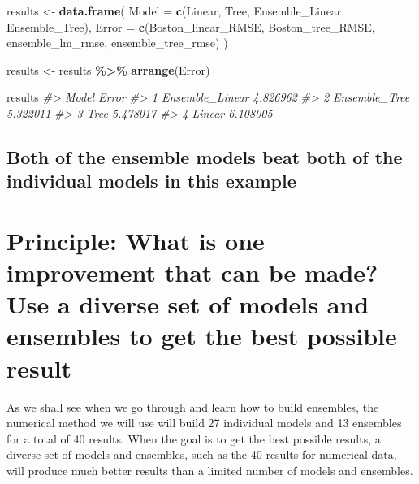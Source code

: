 \documentclass[
]{book}
\newenvironment{Shaded}{\begin{snugshade}}{\end{snugshade}}
\newcommand{\CommentTok}[1]{\textcolor[rgb]{0.56,0.35,0.01}{\textit{#1}}}
\newcommand{\FunctionTok}[1]{\textcolor[rgb]{0.13,0.29,0.53}{\textbf{#1}}}
\newcommand{\NormalTok}[1]{#1}
\newcommand{\OtherTok}[1]{\textcolor[rgb]{0.56,0.35,0.01}{#1}}
\newcommand{\SpecialCharTok}[1]{\textcolor[rgb]{0.81,0.36,0.00}{\textbf{#1}}}
\newcommand{\StringTok}[1]{\textcolor[rgb]{0.31,0.60,0.02}{#1}}
\begin{document}
\begin{Shaded}
\begin{Highlighting}[]
\NormalTok{results }\OtherTok{\textless{}{-}} \FunctionTok{data.frame}\NormalTok{(}
  \StringTok{\textquotesingle{}Model\textquotesingle{}} \OtherTok{=} \FunctionTok{c}\NormalTok{(}\StringTok{\textquotesingle{}Linear\textquotesingle{}}\NormalTok{, }\StringTok{\textquotesingle{}Tree\textquotesingle{}}\NormalTok{, }\StringTok{\textquotesingle{}Ensemble\_Linear\textquotesingle{}}\NormalTok{, }\StringTok{\textquotesingle{}Ensemble\_Tree\textquotesingle{}}\NormalTok{),}
  \StringTok{\textquotesingle{}Error\textquotesingle{}} \OtherTok{=} \FunctionTok{c}\NormalTok{(Boston\_linear\_RMSE, Boston\_tree\_RMSE, ensemble\_lm\_rmse, ensemble\_tree\_rmse)}
\NormalTok{)}

\NormalTok{results }\OtherTok{\textless{}{-}}\NormalTok{ results }\SpecialCharTok{\%\textgreater{}\%} \FunctionTok{arrange}\NormalTok{(Error)}

\NormalTok{results}
\CommentTok{\#\textgreater{}             Model    Error}
\CommentTok{\#\textgreater{} 1 Ensemble\_Linear 4.826962}
\CommentTok{\#\textgreater{} 2   Ensemble\_Tree 5.322011}
\CommentTok{\#\textgreater{} 3            Tree 5.478017}
\CommentTok{\#\textgreater{} 4          Linear 6.108005}
\end{Highlighting}
\end{Shaded}

\subsection{Both of the ensemble models beat both of the individual models in this example}\label{both-of-the-ensemble-models-beat-both-of-the-individual-models-in-this-example}

\section{Principle: What is one improvement that can be made? Use a diverse set of models and ensembles to get the best possible result}\label{principle-what-is-one-improvement-that-can-be-made-use-a-diverse-set-of-models-and-ensembles-to-get-the-best-possible-result}

As we shall see when we go through and learn how to build ensembles, the
numerical method we will use will build 27 individual models and 13
ensembles for a total of 40 results. When the goal is to get the best
possible results, a diverse set of models and ensembles, such as the 40
results for numerical data, will produce much better results than a
limited number of models and ensembles.
\end{document}
